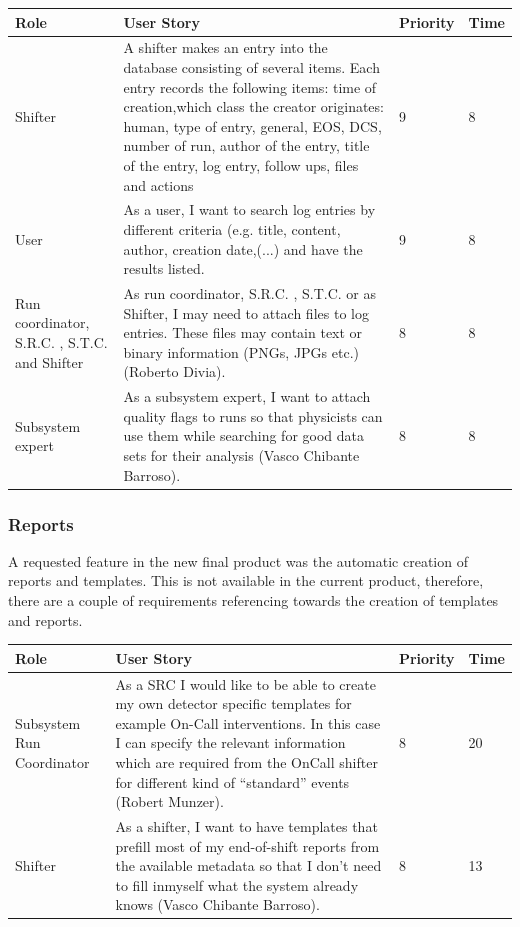 \documentclass[paper=a4, fontsize=11pt,twoside]{scrartcl}	%
\begin{document}
\begin{longtable}{ | p{3cm} | p{8cm} | p{1cm} | l |}
\hline
Role & User Story & Priority & Time \\ \hline
Shifter &  A shifter makes an entry into the database consisting of several items. Each entry records the following items: time of creation,which class the creator originates: human, type of entry, general, EOS, DCS, number of run, author of the entry, title of the entry, log entry, follow ups, files and actions & 9 & 8 \\ \hline
User & As a user, I want to search log entries by different criteria (e.g. title, content, author, creation date,(...) and have the results listed. & 9 & 8 \\ \hline
Run coordinator, S.R.C. , S.T.C. and Shifter& As run coordinator, S.R.C. , S.T.C. or as Shifter, I may need to attach files to log entries. These files may contain text or binary information (PNGs, JPGs etc.) (Roberto Divia). & 8 & 8 \\ \hline
Subsystem expert & As a subsystem expert, I want to attach quality flags to runs so that
physicists can use them while searching for good data sets for their analysis (Vasco Chibante Barroso). & 8 & 8 \\ \hline
\end{longtable}


\subsubsection{Reports}
A requested feature in the new final product was the automatic creation of reports and templates. This is not available in the current product, therefore, there are a couple of requirements referencing towards the creation of templates and reports.
\begin{longtable}{ | p{3cm} | p{8cm} | p{1cm} | l |}
\hline
Role & User Story & Priority & Time \\ \hline
Subsystem Run Coordinator & As a SRC I would like to be able to create my own detector specific templates for example On-Call interventions. In this case I can specify the relevant information which are required from the OnCall shifter for different kind of “standard” events (Robert Munzer). & 8 & 20 \\ \hline
Shifter &  As a shifter, I want to have templates that prefill most of my end-of-shift reports from the available metadata so that I don’t need to fill inmyself what the system already knows (Vasco Chibante Barroso). & 8 & 13 \\ \hline
\end{longtable}
\end{document}
